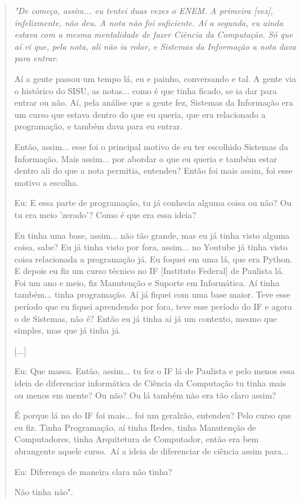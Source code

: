 \begin{quote}
     \itshape
     "De começo, assim... eu tentei duas vezes o ENEM. A primeira [vez], infelizmente, não deu. A nota não foi suficiente. Aí a segunda, eu ainda estava com a mesma mentalidade de fazer Ciência da Computação. Só que aí vi que, pela nota, ali não ia rolar, e Sistemas da Informação a nota dava para entrar. 

    Aí a gente passou um tempo lá, eu e painho, conversando e tal. A gente via o histórico do SISU, as notas... como é que tinha ficado, se ia dar para entrar ou não. Aí, pela análise que a gente fez, Sistemas da Informação era um curso que estava dentro do que eu queria, que era relacionado a programação, e também dava para eu entrar.

    Então, assim... esse foi o principal motivo de eu ter escolhido Sistemas da Informação. Mais assim... por abordar o que eu queria e também estar dentro ali do que a nota permitia, entendeu? Então foi mais assim, foi esse motivo a escolha.

    \colorbox{black!15}{Eu: E essa parte de programação, tu já conhecia alguma coisa ou não? Ou tu era} \colorbox{black!15}{meio 'zerado'? Como é que era essa ideia?}

    Eu tinha uma base, assim... não tão grande, mas eu já tinha visto alguma coisa, sabe? Eu já tinha visto por fora, assim... no Youtube já tinha visto coisa relacionada a programação já. Eu foquei em uma lá, que era Python. E depois eu fiz um curso técnico no IF [Instituto Federal] de Paulista lá. Foi um ano e meio, fiz Manutenção e Suporte em Informática. Aí tinha também... tinha programação. Aí já fiquei com uma base maior. Teve esse período que eu fiquei aprendendo por fora, teve esse período do IF e agora o de Sistemas, não é? Então eu já tinha aí já um contexto, mesmo que simples, mas que já tinha já. 

    [...]

    \colorbox{black!15}{Eu: Que massa. Então, assim... tu fez o IF lá de Paulista e pelo menos essa ideia} \colorbox{black!15}{de diferenciar informática de Ciência da Computação tu tinha mais ou menos em} \colorbox{black!15}{mente? Ou não? Ou lá também não era tão claro assim?}

    É porque lá no do IF foi mais... foi um geralzão, entendeu? Pelo curso que eu fiz. Tinha Programação, aí tinha Redes, tinha Manutenção de Computadores, tinha Arquitetura de Computador, então era bem abrangente aquele curso. Aí a ideia de diferenciar de ciência assim para...

    \colorbox{black!15}{Eu: Diferença de maneira clara não tinha?}

    Não tinha não".
 \end{quote}

